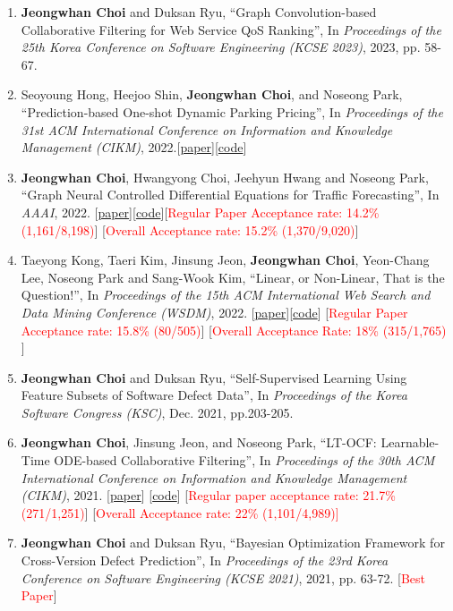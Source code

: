 \documentclass[10pt]{article}
\newenvironment{changemargin}[2]{
  \begin{list}{}{
    \setlength{\topsep}{0pt}
    \setlength{\leftmargin}{#1}
    \setlength{\rightmargin}{#2}
    \setlength{\listparindent}{\parindent}
    \setlength{\itemindent}{\parindent}
    \setlength{\parsep}{\parskip}
  }
  \item[]}{\end{list}
}
\newcommand{\RED}[1]{\textcolor{red}{#1}}
\newenvironment{body} {
	\vspace*{-16pt}
	\begin{changemargin}{-0.25in}{-0.5in}
  }
	{\end{changemargin}
}
\begin{document}
\begin{body}
\begin{enumerate}
    \item \textbf{Jeongwhan Choi} and Duksan Ryu, ``Graph Convolution-based Collaborative Filtering for Web Service QoS Ranking'', In \emph{Proceedings of the 25th Korea Conference on Software Engineering (KCSE 2023)}, 2023, pp. 58-67.
    \item Seoyoung Hong, Heejoo Shin, \textbf{Jeongwhan Choi}, and Noseong Park, ``Prediction-based One-shot Dynamic Parking Pricing'', In \emph{Proceedings of the 31st ACM International Conference on Information and Knowledge Management (CIKM)}, 2022.[\href{https://arxiv.org/abs/2208.14231}{paper}][\href{https://github.com/jeongwhanchoi/one-shot-optimization}{code}]
    \item \textbf{Jeongwhan Choi}, Hwangyong Choi, Jeehyun Hwang and Noseong Park, ``Graph Neural Controlled Differential Equations for Traffic Forecasting'', In \emph{AAAI}, 2022. [\href{https://ojs.aaai.org/index.php/AAAI/article/download/20587/20346}{paper}][\href{https://github.com/jeongwhanchoi/STG-NCDE}{code}][\RED{Regular Paper Acceptance rate: 14.2\% (1,161/8,198)}] [\RED{Overall Acceptance rate: 15.2\% (1,370/9,020)}]
    \item Taeyong Kong, Taeri Kim, Jinsung Jeon, \textbf{Jeongwhan Choi}, Yeon-Chang Lee, Noseong Park and Sang-Wook Kim, ``Linear, or Non-Linear, That is the Question!'', In \textit{Proceedings of the 15th ACM International Web Search and Data Mining Conference (WSDM)}, 2022.  [\href{https://arxiv.org/abs/2111.07265}{paper}][\href{https://github.com/jeongwhanchoi/HMLET}{code}] [\RED{Regular Paper Acceptance rate: 15.8\% (80/505)}] [\RED{Overall Acceptance Rate: 18\%  (315/1,765)} ]
    \item \textbf{Jeongwhan Choi} and Duksan Ryu, ``Self-Supervised Learning Using Feature Subsets of Software Defect Data'',  In \emph{Proceedings of the Korea Software Congress (KSC)}, Dec. 2021, pp.203-205.
    \item \textbf{Jeongwhan Choi}, Jinsung Jeon, and Noseong Park, ``LT-OCF: Learnable-Time ODE-based Collaborative Filtering'', In \emph{Proceedings of the 30th ACM International Conference on Information and Knowledge Management (CIKM)}, 2021. [\href{https://arxiv.org/pdf/2108.06208.pdf}{paper}] [\href{https://github.com/jeongwhanchoi/LT-OCF}{code}]  [\RED{Regular paper acceptance rate: 21.7\% (271/1,251)}]  [\RED{Overall Acceptance rate: 22\% (1,101/4,989)]}
    \item \textbf{Jeongwhan Choi} and Duksan Ryu, ``Bayesian Optimization Framework for Cross-Version Defect Prediction'', In \emph{Proceedings of the 23rd Korea Conference on Software Engineering (KCSE 2021)}, 2021, pp. 63-72.  [\RED{Best Paper}]

\end{enumerate}
\end{body}
\end{document}
